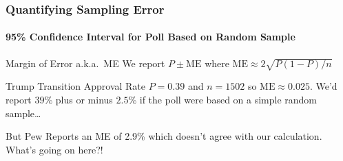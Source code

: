 %
%
\begin{frame}
\frametitle{Quantifying Sampling Error}
\framesubtitle{95\% Confidence Interval for Poll Based on Random Sample}

\begin{block}{Margin of Error a.k.a.\ ME}
  We report $P \pm \mbox{ME}$ where $\mbox{ME} \approx 2 \sqrt{P(1-P)/n}$
\end{block}

\pause

\begin{block}{Trump Transition Approval Rate}
$P = 0.39$ and $n = 1502$ so $\mbox{ME} \approx 0.025$.  We'd report $39\%$ plus or minus $2.5\%$ if the poll were based on a simple random sample\dots
\end{block}

\vspace{1em}

\pause

\alert{But Pew Reports an ME of 2.9\% which doesn't agree with our calculation. What's going on here?!}

\end{frame}

